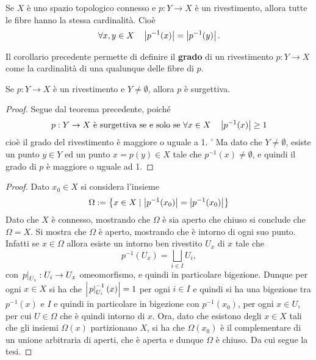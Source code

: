 \documentclass[]{article}
\begin{document}
\begin{theorem}  \nl
    Se $X$ \`e uno spazio topologico connesso e $p: Y \to X$ \`e un rivestimento, allora tutte le fibre hanno la stessa cardinalit\`a. \nl
    Cio\`e \[
        \forall x,y \in X \quad \left| p^{-1}(x) \right| = \left| p^{-1}(y) \right|.
    \]
\end{theorem}

\begin{definition}  \nl
    Il corollario precedente permette di definire il \textbf{grado} di un rivestimento $p: Y \to X$ come la cardinalit\`a di una qualunque delle fibre di $p$.
\end{definition}

\begin{corollary} 
    Se $p: Y \to X$ \`e un rivestimento e $Y \neq \emptyset$, allora $p$ \`e surgettiva.
\end{corollary}

\begin{proof} \nl
    Segue dal teorema precedente, poich\'e 
    \[p: Y \to X \text{ \`e surgettiva se e solo se } \forall x \in X \quad \left| p^{-1}(x) \right| \geq 1\]
    cio\`e il grado del rivestimento \`e maggiore o uguale a 1. \nl'
    Ma dato che $Y \neq \emptyset$, esiste un punto $y \in Y$ ed un punto $x = p(y) \in X$ tale che $p^{-1}(x) \neq \emptyset$, e quindi il grado
    di $p$ \`e maggiore o uguale ad 1.
\end{proof}


\begin{proof} \nl
    Dato $x_0 \in X$ si considera l'insieme
    \[ \Omega := \left\{ x \in X \mid \left| p^{-1}(x_0) \right| = \left| p^{-1}(x_0) \right| \right\}\]
    Dato che $X$ \`e connesso, mostrando che $\Omega$ \`e sia aperto che chiuso si conclude che $\Omega = X$. \nl
    Si mostra che $\Omega$ \`e aperto, mostrando che \`e intorno di ogni suo punto. \nl
    Infatti se $x \in \Omega$ allora esiste un intorno ben rivestito $U_x$ di $x$ tale che
    \[
        p^{-1}(U_x) = \bigsqcup_{i \in I} U_i,
    \]
    con $\left. p \right|_{U_i}: U_i \to U_x$ omeomorfismo, e quindi in particolare bigezione. \nl
    Dunque per ogni $x \in X$ si ha che $\left| \left. p \right|_{U_i}^{-1}(x) \right| = 1$ per ogni $i \in I$ e quindi si ha una bigezione
    tra $p^{-1}(x)$ e $I$ e quindi in particolare in bigezione con $p^{-1}(x_0)$, per ogni $x \in U$, per cui $U \in \Omega$ che \`e quindi intorno di $x$. \nl
    Ora, dato che esistono degli $x \in X$ tali che gli insiemi $\Omega(x)$ partizionano $X$, si ha che $\Omega(x_0)$ \`e il complementare di un
    unione arbitraria di aperti, che \`e aperta e dunque $\Omega$ \`e chiuso. Da cui segue la tesi. \nl
\end{proof}
\end{document}
